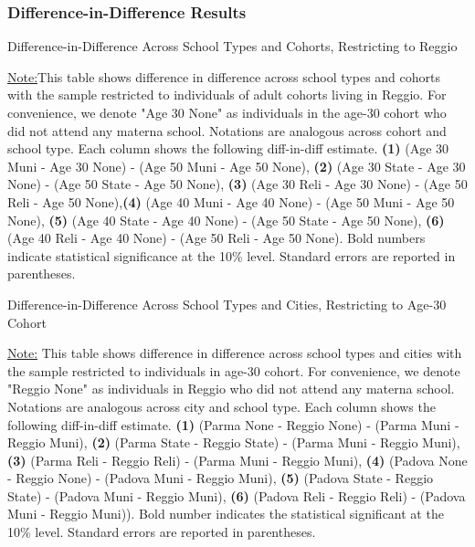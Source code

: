 \documentclass[11pt]{article}
\begin{document}
\subsubsection{Difference-in-Difference Results}
\begin{table}[H]
\begin{center}
	\caption{Difference-in-Difference Across School Types and Cohorts, Restricting to Reggio} \label{table:LC-Reggio}
	\scalebox{0.80}{
		}
\end{center}
\footnotesize
\underline{Note:}This table shows difference in difference across school types and cohorts with the sample restricted to individuals of adult cohorts living in Reggio. For convenience, we denote "Age 30 None" as individuals in the age-30 cohort who did not attend any materna school. Notations are analogous across cohort and school type. Each column shows the following diff-in-diff estimate. \textbf{(1)} (Age 30 Muni - Age 30 None) - (Age 50 Muni - Age 50 None), \textbf{(2)} (Age 30 State - Age 30 None) - (Age 50 State - Age 50 None), \textbf{(3)}  (Age 30 Reli - Age 30 None) - (Age 50 Reli - Age 50 None),\textbf{(4)} (Age 40 Muni - Age 40 None) - (Age 50 Muni - Age 50 None), \textbf{(5)} (Age 40 State - Age 40 None) - (Age 50 State - Age 50 None), \textbf{(6)}  (Age 40 Reli - Age 40 None) - (Age 50 Reli - Age 50 None). Bold numbers indicate statistical significance at the 10\% level. Standard errors are reported in parentheses. 
\end{table}

\begin{table}[H]
\begin{center}
	\caption{Difference-in-Difference Across School Types and Cities, Restricting to Age-30 Cohort} \label{table:LCh-30}
	\scalebox{0.80}{
		}
\end{center}
\footnotesize
\underline{Note:} This table shows difference in difference across school types and cities with the sample restricted to individuals in age-30 cohort. For convenience, we denote "Reggio None" as individuals in Reggio who did not attend any materna school. Notations are analogous across city and school type. Each column shows the following diff-in-diff estimate. \textbf{(1)} (Parma None - Reggio None) - (Parma Muni - Reggio Muni), \textbf{(2)} (Parma State - Reggio State) - (Parma Muni - Reggio Muni), \textbf{(3)} (Parma Reli - Reggio Reli) - (Parma Muni - Reggio Muni), \textbf{(4)} (Padova None - Reggio None) - (Padova Muni - Reggio Muni),  \textbf{(5)} (Padova State - Reggio State) - (Padova Muni - Reggio Muni), \textbf{(6)} (Padova Reli - Reggio Reli) - (Padova Muni - Reggio Muni)). Bold number indicates the statistical significant at the 10\% level. Standard errors are reported in parentheses. 
\end{table}
\end{document}
